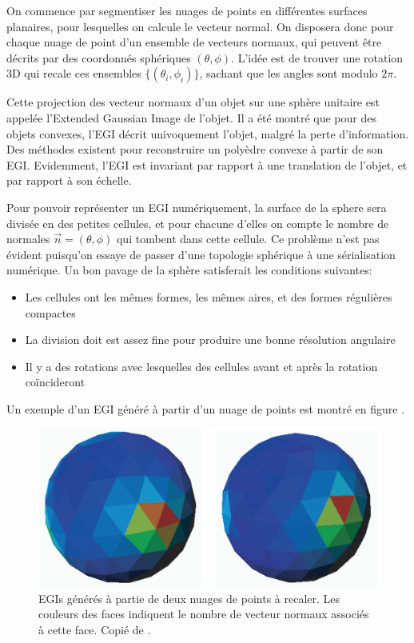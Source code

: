 \documentclass[a4paper,10pt]{scrreprt}
\begin{document}
On commence par segmentiser les nuages de points en différentes surfaces planaires, pour lesquelles on calcule le vecteur normal. On disposera donc pour chaque nuage de point d'un ensemble de vecteurs normaux, qui peuvent être décrits par des coordonnés sphériques $(\theta, \phi)$. L'idée est de trouver une rotation 3D qui recale ces ensembles $\{(\theta_i, \phi_i)\}$, sachant que les angles sont modulo $2 \pi$.

Cette projection des vecteur normaux d'un objet sur une sphère unitaire est appelée l'Extended Gaussian Image de l'objet. \cite{Horn1984} Il a été montré que pour des objets convexes, l'EGI décrit univoquement l'objet, malgré la perte d'information. Des méthodes existent pour reconstruire un polyèdre convexe à partir de son EGI. Evidemment, l'EGI est invariant par rapport à une translation de l'objet, et par rapport à son échelle.

Pour pouvoir représenter un EGI numériquement, la surface de la sphere sera divisée en des petites cellules, et pour chacune d'elles on compte le nombre de normales $\vec{n} = (\theta, \phi)$ qui tombent dans cette cellule. Ce problème n'est pas évident puisqu'on essaye de passer d'une topologie sphérique à une sérialisation numérique. Un bon pavage de la sphère satisferait les conditions suivantes: 
\begin{itemize}
	\item Les cellules ont les mêmes formes, les mêmes aires, et des formes régulières compactes
	\item La division doit est assez fine pour produire une bonne résolution angulaire
	\item Il y a des rotations avec lesquelles des cellules avant et après la rotation coïncideront
\end{itemize}
Un exemple d'un EGI généré à partir d'un nuage de points est montré en figure .

\begin{figure}[p]
\center
\includegraphics[width=.5\textwidth]{egi.png}
\caption{EGIs générés à partie de deux nuages de points à recaler. Les couleurs des faces indiquent le nombre de vecteur normaux associés à cette face. Copié de \cite{Dold2005}.}
\label{fig:egi}
\end{figure}
\end{document}
